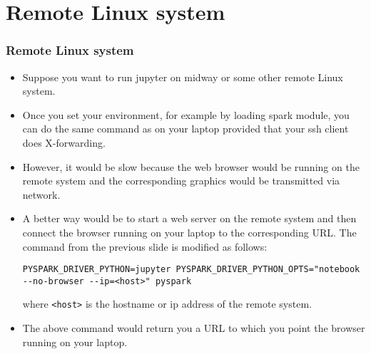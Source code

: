\documentclass{beamer}
\begin{document}
\section{Remote Linux system}
\begin{frame}[fragile]
  \frametitle{Remote Linux system}
  
  \begin{itemize}
  \item Suppose you want to run jupyter on midway or some other remote Linux system.
  \item Once you set your environment, for example by loading spark module,
    you can do the same command as on your laptop provided that your ssh client does X-forwarding.
  \item However, it would be slow because the web browser would be running on the remote system and the corresponding graphics would be transmitted
    via network.
  \item A better way would be to start a web server on the remote system and then connect the browser running on your laptop to the corresponding
    URL. The command from the previous slide is modified as follows:
    {\tiny
      {\color{mycolorcli}
\begin{verbatim}
PYSPARK_DRIVER_PYTHON=jupyter PYSPARK_DRIVER_PYTHON_OPTS="notebook --no-browser --ip=<host>" pyspark
\end{verbatim}
      }
    }
    where {\color{mycolorcli}\verb|<host>|} is the hostname or ip address of the remote system.
  \item The above command would return you a URL to which you point the browser running on your laptop.
  \end{itemize}

\end{frame}
\end{document}

